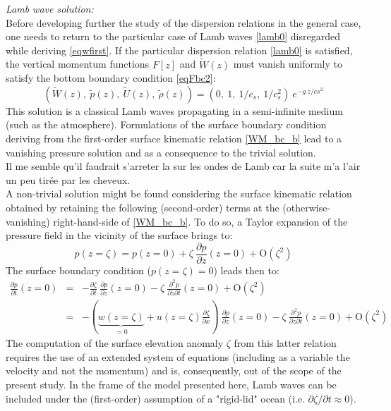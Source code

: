 \documentclass[a4paper,11pt]{article}
\begin{document}
\textit{Lamb wave solution:}\\
Before developing further the study of the dispersion relations in the general case, one needs to return to the particular case of Lamb waves \ref{lamb0} disregarded while deriving \ref{eqwfirst}. If the particular dispersion relation \ref{lamb0} is satisfied, the vertical momentum functions $F[z]$ and $\widetilde{W}(z)$ must vanish uniformly to satisfy the bottom boundary condition \ref{eqFbc2}:
\begin{equation}
    \label{polar0}
    \displaystyle
        \left(\widetilde{W}(z),\ 
        \widetilde{p}(z),\ 
        \widetilde{U}(z),\ 
        \widetilde{\rho}(z)\right)=
        \left(0,\ 1,\ 1/c_s
        ,\ 1/c_s^2 \right)\ e^{-g\ z/cs^2}
\end{equation}
This solution is a classical Lamb waves propagating in a semi-infinite medium (such as the atmosphere). Formulations of the surface boundary condition deriving from the first-order surface kinematic relation \ref{WM_bc_b} lead to a vanishing pressure solution and as a consequence to the trivial solution.\\
{\color{red} Il me semble qu'il faudrait s'arreter la sur les ondes de Lamb car la suite m'a l'air un peu tirée par les cheveux.}\\
A non-trivial solution might be found considering the surface kinematic relation obtained by retaining the following (second-order) terms at the (otherwise-vanishing) right-hand-side of \ref{WM_bc_b}. To do so, a Taylor expansion of the pressure field in the vicinity of the surface brings to:
\begin{equation}
    \displaystyle
    p(z=\zeta)=p(z=0)+\zeta\ \frac{\partial p}{\partial z}(z=0) 
    + \mathrm{O}(\zeta ^2)
\end{equation}
The surface boundary condition ($p(z=\zeta)=0$) leads then to:
\begin{equation}
    \begin{array}{rcl}
    \displaystyle
    \frac{\partial p}{\partial t}(z=0) &=&
    -\frac{\partial\zeta}{\partial t}\ \frac{\partial p}{\partial z}(z=0) 
    -\zeta\ \frac{\partial ^2 p}{\partial z\partial t}(z=0) 
    + \mathrm{O}(\zeta ^2)\\[4mm]
    &=&
    -\left(\underbrace{w(z=\zeta)}_{=0}
    +u(z=\zeta)\frac{\partial\zeta}{\partial x}\right)
    \ \frac{\partial p}{\partial z}(z=0) 
    -\zeta\ \frac{\partial ^2 p}{\partial z\partial t}(z=0) 
    + \mathrm{O}(\zeta ^2)
    \end{array}
\end{equation}
The computation of the surface elevation anomaly $\zeta$ from this latter relation requires the use of an extended system of equations (including as a variable the velocity and not the momentum) and is, consequently, out of the scope of the present study. In the frame of the model presented here, Lamb waves can be included under the (first-order) assumption of a "rigid-lid" ocean (i.e. $\partial\zeta / \partial t \approx 0$).\\
\end{document}
